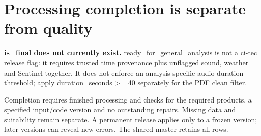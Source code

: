 \documentclass[a4paper,9pt]{extarticle}
\begin{document}
\section*{Processing completion is separate from quality}

\textbf{is\_final does not currently exist.} ready\_for\_general\_analysis is not a ci-tec release flag: it requires trusted time provenance plus unflagged sound, weather and Sentinel together. It does not enforce an analysis-specific audio duration threshold; apply duration\_seconds \textgreater{}= 40 separately for the PDF clean filter.\par

Completion requires finished processing and checks for the required products, a specified input/code version and no outstanding repairs. Missing data and suitability remain separate. A permanent release applies only to a frozen version; later versions can reveal new errors. The shared master retains all rows.\par
\end{document}
